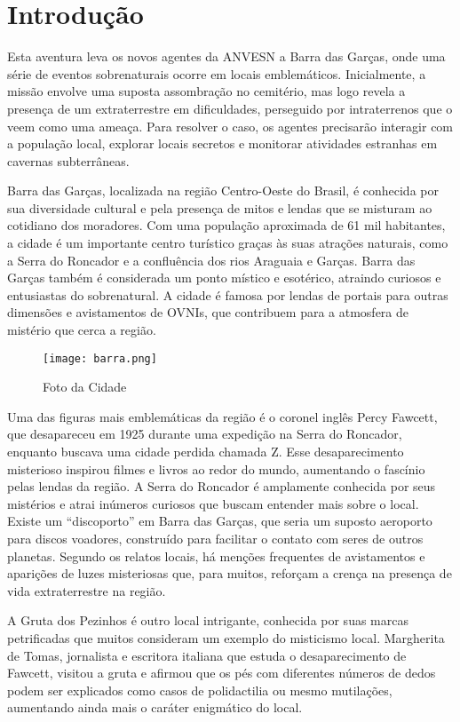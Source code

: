 \chapter{Introdução}

Esta aventura leva os novos agentes da ANVESN a Barra das Garças, onde uma série de eventos sobrenaturais ocorre em locais emblemáticos. Inicialmente, a missão envolve uma suposta assombração no cemitério, mas logo revela a presença de um extraterrestre em dificuldades, perseguido por intraterrenos que o veem como uma ameaça. Para resolver o caso, os agentes precisarão interagir com a população local, explorar locais secretos e monitorar atividades estranhas em cavernas subterrâneas.

Barra das Garças, localizada na região Centro-Oeste do Brasil, é conhecida por sua diversidade cultural e pela presença de mitos e lendas que se misturam ao cotidiano dos moradores. Com uma população aproximada de 61 mil habitantes, a cidade é um importante centro turístico graças às suas atrações naturais, como a Serra do Roncador e a confluência dos rios Araguaia e Garças. Barra das Garças também é considerada um ponto místico e esotérico, atraindo curiosos e entusiastas do sobrenatural. A cidade é famosa por lendas de portais para outras dimensões e avistamentos de OVNIs, que contribuem para a atmosfera de mistério que cerca a região.

\begin{figure}
    \centering
    \texttt{[image: barra.png]}
    \caption{Foto da Cidade}
    \label{fig:cidade}
\end{figure}

Uma das figuras mais emblemáticas da região é o coronel inglês Percy Fawcett, que desapareceu em 1925 durante uma expedição na Serra do Roncador, enquanto buscava uma cidade perdida chamada Z. Esse desaparecimento misterioso inspirou filmes e livros ao redor do mundo, aumentando o fascínio pelas lendas da região. A Serra do Roncador é amplamente conhecida por seus mistérios e atrai inúmeros curiosos que buscam entender mais sobre o local. Existe um ``discoporto'' em Barra das Garças, que seria um suposto aeroporto para discos voadores, construído para facilitar o contato com seres de outros planetas. Segundo os relatos locais, há menções frequentes de avistamentos e aparições de luzes misteriosas que, para muitos, reforçam a crença na presença de vida extraterrestre na região.

A Gruta dos Pezinhos é outro local intrigante, conhecida por suas marcas petrificadas que muitos consideram um exemplo do misticismo local. Margherita de Tomas, jornalista e escritora italiana que estuda o desaparecimento de Fawcett, visitou a gruta e afirmou que os pés com diferentes números de dedos podem ser explicados como casos de polidactilia ou mesmo mutilações, aumentando ainda mais o caráter enigmático do local.

